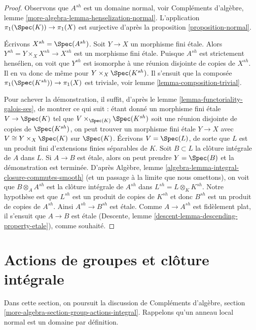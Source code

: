 \begin{proof}
Observons que $A^{sh}$ est un domaine normal, voir
Compléments d'algèbre, lemme \ref{more-algebra-lemma-henselization-normal}.
L'application $\pi_1(\Spec(K)) \to \pi_1(X)$ est surjective d'après la
proposition \ref{proposition-normal}.

\medskip\noindent
Écrivons $X^{sh} = \Spec(A^{sh})$. Soit $Y \to X$ un morphisme fini étale.
Alors $Y^{sh} = Y \times_X X^{sh} \to X^{sh}$ est un morphisme fini étale.
Puisque $A^{sh}$ est strictement hensélien, on voit que $Y^{sh}$ est isomorphe
à une réunion disjointe de copies de $X^{sh}$. Il en va donc de même pour
$Y \times_X \Spec(K^{sh})$. Il s'ensuit que la composée
$\pi_1(\Spec(K^{sh})) \to \pi_1(X)$ est triviale, voir
lemme \ref{lemma-composition-trivial}.

\medskip\noindent
Pour achever la démonstration, il suffit, d'après le
lemme \ref{lemma-functoriality-galois-ses},
de montrer ce qui suit : étant donné un morphisme fini étale
$V \to \Spec(K)$ tel que $V \times_{\Spec(K)} \Spec(K^{sh})$
soit une réunion disjointe de copies de $\Spec(K^{sh})$, on peut trouver un
morphisme fini étale
$Y \to X$ avec $V \cong Y \times_X \Spec(K)$ sur $\Spec(K)$.
Écrivons $V = \Spec(L)$, de sorte que $L$ est un produit fini
d'extensions finies séparables de $K$.
Soit $B \subset L$ la clôture intégrale de $A$ dans $L$.
Si $A \to B$ est étale, alors on peut prendre $Y = \Spec(B)$
et la démonstration est terminée. D'après
Algèbre, lemme \ref{algebra-lemma-integral-closure-commutes-smooth}
(et un passage à la limite que nous omettons),
on voit que $B \otimes_A A^{sh}$ est la clôture intégrale de
$A^{sh}$ dans $L^{sh} = L \otimes_K K^{sh}$.
Notre hypothèse est que $L^{sh}$ est un produit de copies de
$K^{sh}$ et donc $B^{sh}$ est un produit de copies de $A^{sh}$.
Ainsi $A^{sh} \to B^{sh}$ est étale. Comme $A \to A^{sh}$ est
fidèlement plat, il s'ensuit que $A \to B$ est étale
(Descente, lemme \ref{descent-lemma-descending-property-etale}),
comme souhaité.
\end{proof}







\section{Actions de groupes et clôture intégrale}
\label{section-group-actions-integral}

\noindent
Dans cette section, on poursuit la discussion de
Compléments d'algèbre, section \ref{more-algebra-section-group-actions-integral}.
Rappelons qu'un anneau local normal est un domaine par définition.

